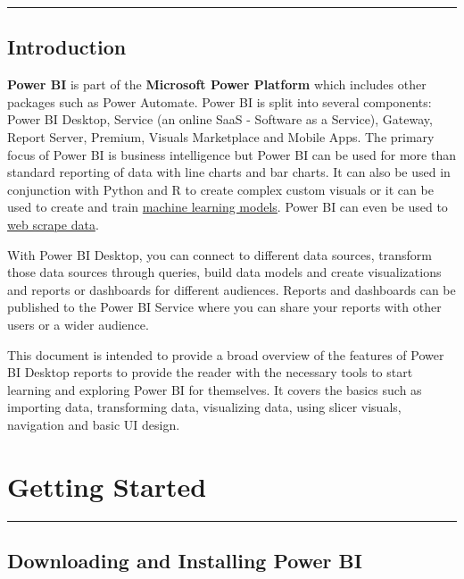 \documentclass[
]{book}
\begin{document}
\begin{center}\rule{0.5\linewidth}{0.5pt}\end{center}

\hypertarget{introduction}{%
\section{Introduction}\label{introduction}}

\textbf{Power BI} is part of the \textbf{Microsoft Power Platform} which includes other packages such as Power Automate. Power BI is split into several components: Power BI Desktop, Service (an online SaaS - Software as a Service), Gateway, Report Server, Premium, Visuals Marketplace and Mobile Apps. The primary focus of Power BI is business intelligence but Power BI can be used for more than standard reporting of data with line charts and bar charts. It can also be used in conjunction with Python and R to create complex custom visuals or it can be used to create and train \href{https://docs.microsoft.com/en-us/power-bi/connect-data/service-tutorial-build-machine-learning-model}{machine learning models}. Power BI can even be used to \href{https://docs.microsoft.com/en-us/power-bi/connect-data/desktop-connect-to-web-by-example}{web scrape data}.

With Power BI Desktop, you can connect to different data sources, transform those data sources through queries, build data models and create visualizations and reports or dashboards for different audiences. Reports and dashboards can be published to the Power BI Service where you can share your reports with other users or a wider audience.

This document is intended to provide a broad overview of the features of Power BI Desktop reports to provide the reader with the necessary tools to start learning and exploring Power BI for themselves. It covers the basics such as importing data, transforming data, visualizing data, using slicer visuals, navigation and basic UI design.

\hypertarget{getting-started}{%
\chapter{Getting Started}\label{getting-started}}

\begin{center}\rule{0.5\linewidth}{0.5pt}\end{center}

\hypertarget{downloading-and-installing-power-bi}{%
\section{Downloading and Installing Power BI}\label{downloading-and-installing-power-bi}}
\end{document}
